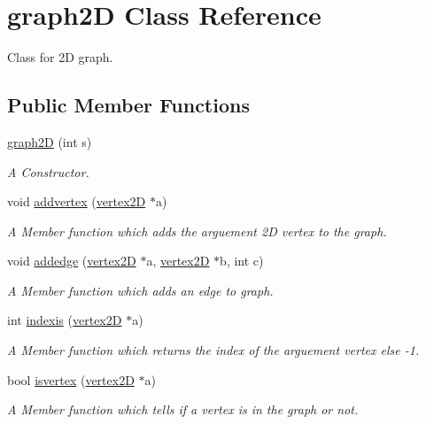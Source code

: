 \hypertarget{classgraph2D}{}\section{graph2D Class Reference}
\label{classgraph2D}


Class for 2D graph.  


\subsection*{Public Member Functions}
\begin{DoxyCompactItemize}
\item 
\hyperlink{classgraph2D_a4702eac5247e6a9c9336b212b105dddf}{graph2D} (int s)
\begin{DoxyCompactList}\small\item\em A Constructor. \end{DoxyCompactList}\item 
void \hyperlink{classgraph2D_a0bc80a8850d11d49722f30fd0081dc1e}{addvertex} (\hyperlink{classvertex2D}{vertex2D} $\ast$a)
\begin{DoxyCompactList}\small\item\em A Member function which adds the arguement 2D vertex to the graph. \end{DoxyCompactList}\item 
void \hyperlink{classgraph2D_a1ec89f9154f7a06ca9440c54114a5ae8}{addedge} (\hyperlink{classvertex2D}{vertex2D} $\ast$a, \hyperlink{classvertex2D}{vertex2D} $\ast$b, int c)
\begin{DoxyCompactList}\small\item\em A Member function which adds an edge to graph. \end{DoxyCompactList}\item 
int \hyperlink{classgraph2D_a49365267df78a75819ef8a8647a514d0}{indexis} (\hyperlink{classvertex2D}{vertex2D} $\ast$a)
\begin{DoxyCompactList}\small\item\em A Member function which returns the index of the arguement vertex else -\/1. \end{DoxyCompactList}\item 
bool \hyperlink{classgraph2D_a82180cab2d84b3ec314b9941a600227c}{isvertex} (\hyperlink{classvertex2D}{vertex2D} $\ast$a)
\begin{DoxyCompactList}\small\item\em A Member function which tells if a vertex is in the graph or not. \end{DoxyCompactList}\item 

\end{DoxyCompactItemize}
